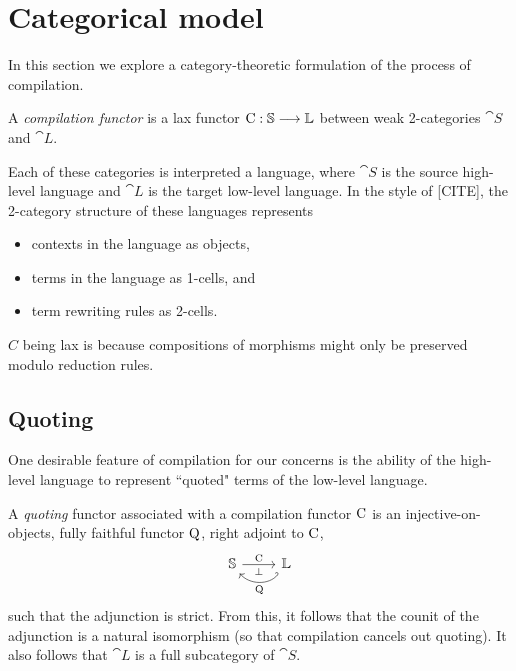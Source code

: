 \section{Categorical model}\label{sec:model}

In this section we explore a category-theoretic formulation of the process of
compilation.

\begin{definition}
  A \emph{compilation functor} is a lax functor $\mathrm C : \mathbb S \longrightarrow \mathbb L$
  between weak 2-categories $\cat S$ and $\cat L$.
\end{definition}
Each of these categories is interpreted a language,
where $\cat S$ is the source high-level language and $\cat L$ is the target
low-level language. In the style of [CITE], the 2-category structure of these
languages represents
%
\begin{itemize}
  \item contexts in the language as objects,
  \item terms in the language as 1-cells, and
  \item term rewriting rules as 2-cells.
\end{itemize}
%
$C$ being lax is because compositions of morphisms might only be
preserved modulo reduction rules.

\subsection{Quoting}

One desirable feature of compilation for our concerns is the ability of the
high-level language to represent ``quoted" terms of the low-level language.

\begin{definition}
  A \emph{quoting} functor associated with a compilation functor $\mathrm C$
  is an injective-on-objects, fully faithful functor $\mathrm Q$, right adjoint to $\mathrm C$,
  $$
    \begin{tikzcd}
      \cat S \arrow[r, "\fun C", "\bot"'] & \cat L \arrow[l, hook', bend left=50, "\fun Q"]
    \end{tikzcd}
  $$
  such that the adjunction is strict. From this, it follows that the counit of
  the adjunction is a natural isomorphism (so that compilation cancels out
  quoting). It also follows that $\cat L$ is a full subcategory of $\cat S$.
\end{definition}

